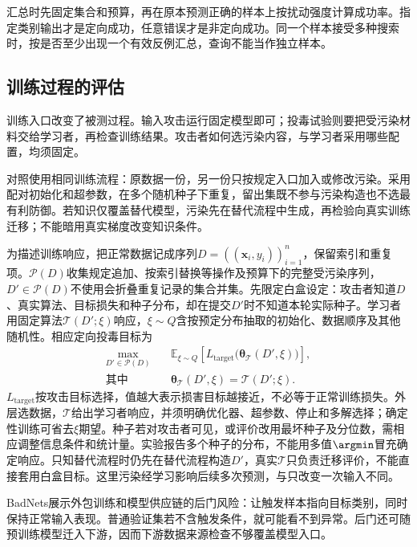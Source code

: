 汇总时先固定集合和预算，再在原本预测正确的样本上按扰动强度计算成功率。指定类别输出才是定向成功，任意错误才是非定向成功。同一个样本接受多种搜索时，按是否至少出现一个有效反例汇总，查询不能当作独立样本。

\subsection{训练过程的评估}
\label{sec:security-training-test}

训练入口改变了被测过程。输入攻击运行固定模型即可；投毒试验则要把受污染材料交给学习者，再检查训练结果。攻击者如何选污染内容，与学习者采用哪些配置，均须固定。

对照使用相同训练流程：原数据一份，另一份只按规定入口加入或修改污染。采用配对初始化和超参数，在多个随机种子下重复，留出集既不参与污染构造也不选最有利防御。若知识仅覆盖替代模型，污染先在替代流程中生成，再检验向真实训练迁移；不能暗用真实梯度改变知识条件。

为描述训练响应，把正常数据记成序列$D=((\bm{x}_i,y_i))_{i=1}^{n}$，保留索引和重复项。$\mathcal P(D)$收集规定追加、按索引替换等操作及预算下的完整受污染序列，$D'\in\mathcal P(D)$不使用会折叠重复记录的集合并集。先限定白盒设定：攻击者知道$D$、真实算法、目标损失和种子分布，却在提交$D'$时不知道本轮实际种子。学习者用固定算法$\mathcal T(D';\xi)$响应，$\xi\sim Q$含按预定分布抽取的初始化、数据顺序及其他随机性。相应定向投毒目标为
\begin{equation}
 \begin{aligned}
 \max_{D'\in\mathcal P(D)}\quad&
 \mathbb E_{\xi\sim Q}
 \left[L_{\mathrm{target}}\bigl(\bm{\theta}_{\mathcal T}
       (D',\xi)\bigr)\right],\\
 \text{其中}\quad&
 \bm{\theta}_{\mathcal T}(D',\xi)
 =\mathcal T(D';\xi).
 \end{aligned}
 \label{eq:security-poison-bilevel}
\end{equation}
$L_{\mathrm{target}}$按攻击目标选择，值越大表示损害目标越接近，不必等于正常训练损失。外层选数据，$\mathcal T$给出学习者响应，并须明确优化器、超参数、停止和多解选择；确定性训练可省去$\xi$期望。种子若对攻击者可见，或评价改用最坏种子及分位数，需相应调整信息条件和统计量。实验报告多个种子的分布，不能用多值$\argmin$冒充确定响应。只知替代流程时仍先在替代流程构造$D'$，真实$\mathcal T$只负责迁移评价，不能直接套用白盒目标。这里污染经学习影响后续多次预测，与只改变一次输入不同。

BadNets展示外包训练和模型供应链的后门风险：让触发样本指向目标类别，同时保持正常输入表现。普通验证集若不含触发条件，就可能看不到异常。后门还可随预训练模型迁入下游，因而下游数据来源检查不够覆盖模型入口。

